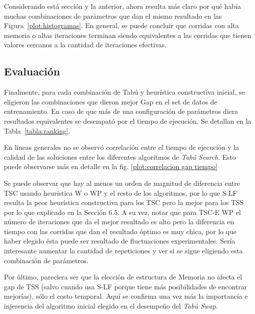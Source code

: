 Considerando está sección y la anterior, ahora resulta más claro por qué había muchas combinaciones de parámetros que dan el mismo resultado en las Figura~\ref{plot:histogramas}. En general, se puede concluir que corridas con alta memoria o altas iteraciones terminan siendo equivalentes a las corridas que tienen valores cercanos a la cantidad de iteraciones efectivas.


\subsection{Evaluación}

Finalmente, para cada combinación de Tabú y heurística constructiva inicial, se eligieron las combinaciones que dieron mejor Gap en el set de datos de entrenamiento. En caso de que más de una configuración de parámetros diera resultados equivalentes se desempató por el tiempo de ejecución. Se detallan en la Tabla~\ref{tabla:ranking}.

En lineas generales no se observó correlación entre el tiempo de ejecución y la calidad de las soluciones entre los diferentes algoritmos de \textit{Tabú Search}. Esto puede observarse más en detalle en la fig. \ref{plot:correlacion gap tiempo}

Se puede observar que hay al menos un orden de magnitud de diferencia entre TSC usando heurística W o WP y el resto de los algoritmos, por lo que S-LF resulta la peor heurística constructiva para los TSC pero la mejor para los TSS por lo que explicado en la Sección 6.5. A su vez, notar que para TSC-E WP el número de iteraciones que da el mejor resultado es alto pero la diferencia en tiempo con las corridas que dan el resultado óptimo es muy chica, por lo que haber elegido ésta puede ser resultado de fluctuaciones experimentales. Sería interesante aumentar la cantidad de repeticiones y ver si se sigue eligiendo esta combinación de parámetros.

Por último, pareciera ser que la elección de estructura de Memoria no afecta el gap de TSS (salvo cuando usa S-LF porque tiene más posibilidades de encontrar mejorías), sólo el costo temporal. Aquí se confirma una vez más la importancia e injerencia del algoritmo inicial elegido en el desempeño del \textit{Tabú Swap}.

